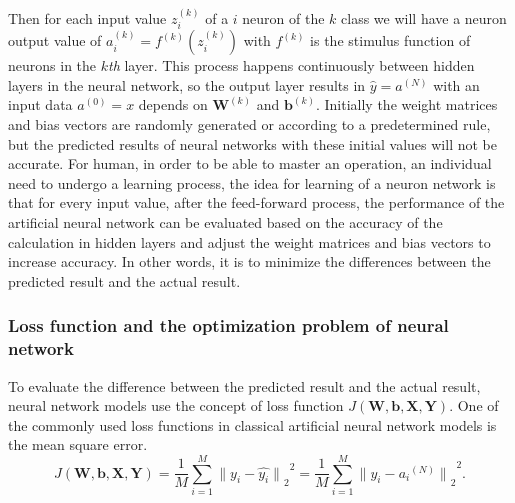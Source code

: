 \documentclass[conference]{IEEEtran}
\begin{document}
Then for each input value $ z ^ {(k)} _ i $ of a $ i $ neuron of the $ k $ class we will have a neuron output value of $ a ^ {(k)} _ i = f ^ {(k)} \left( z ^ {(k)} _ i \right) $ with $ f ^ {(k)} $ is the stimulus function of neurons in the $ k $\emph{th} layer. This process happens continuously between hidden layers in the neural network, so the output layer results in $ \widehat {y} = a ^ {(N)} $ with an input data $ a ^ {(0 )} = x $ depends on $ \boldsymbol {W} ^ {(k)} $ and $ \boldsymbol {b} ^ {(k)} $. Initially the weight matrices and bias vectors are randomly generated or according to a predetermined rule, but the predicted results of neural networks with these initial values will not be accurate. For human, in order to be able to master an operation, an individual need to undergo a learning process, the idea for learning of a neuron network is that for every input value, after the feed-forward process, the performance of the artificial neural network can be evaluated based on the accuracy of the calculation in hidden layers and adjust the weight matrices and bias vectors to increase accuracy. In other words, it is to minimize the differences between the predicted result and the actual result.
\subsubsection{Loss function and the optimization problem of neural network}
To evaluate the difference between the predicted result and the actual result, neural network models use the concept of loss function $ J \left( {\boldsymbol {W}}, {\boldsymbol {b}}, {\boldsymbol {X}}, {\boldsymbol {Y}} \right) $. One of the commonly used loss functions in classical artificial neural network models is the mean square error.
\begin{equation}
	J
	\left(
		{\boldsymbol{W}},{\boldsymbol{b}},{\boldsymbol{X}},{\boldsymbol{Y}}
	\right)
	=
	{
		{\frac{1}{M}} 
		{\sum_{i=1}^{M}} 
		{ { {\parallel} y_i - \widehat{y_i} {\parallel} }_2 }^2
	}
	=
	{
		{\frac{1}{M}} 
		{\sum_{i=1}^{M}} 
		{ { {\parallel} y_i - {a_i}^{(N)} {\parallel} }_2 }^2
	}.
\end{equation}
\end{document}
